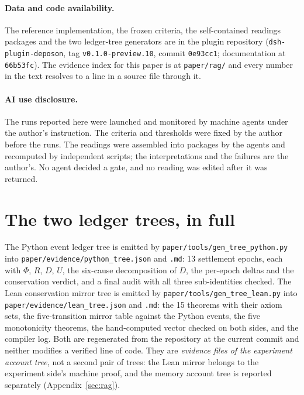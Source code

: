 \documentclass[11pt,a4paper]{article}
\begin{document}
\paragraph{Data and code availability.}
The reference implementation, the frozen criteria, the self-contained readings packages and the two ledger-tree generators are in the plugin repository (\texttt{dsh-plugin-deposon}, tag \texttt{v0.1.0-preview.10}, commit \texttt{0e93cc1}; documentation at \texttt{66b53fc}). The evidence index for this paper is at \texttt{paper/rag/} and every number in the text resolves to a line in a source file through it.

\paragraph{AI use disclosure.}
The runs reported here were launched and monitored by machine agents under the author's instruction. The criteria and thresholds were fixed by the author before the runs. The readings were assembled into packages by the agents and recomputed by independent scripts; the interpretations and the failures are the author's. No agent decided a gate, and no reading was edited after it was returned.

\appendix

\section{The two ledger trees, in full}
\label{app:trees}
The Python event ledger tree is emitted by \texttt{paper/tools/gen\_tree\_python.py} into \texttt{paper/evidence/python\_tree.json} and \texttt{.md}: 13 settlement epochs, each with $\Phi$, $R$, $D$, $U$, the six-cause decomposition of $D$, the per-epoch deltas and the conservation verdict, and a final audit with all three sub-identities checked. The Lean conservation mirror tree is emitted by \texttt{paper/tools/gen\_tree\_lean.py} into \texttt{paper/evidence/lean\_tree.json} and \texttt{.md}: the 15 theorems with their axiom sets, the five-transition mirror table against the Python events, the five monotonicity theorems, the hand-computed vector checked on both sides, and the compiler log. Both are regenerated from the repository at the current commit and neither modifies a verified line of code. They are \emph{evidence files of the experiment account tree}, not a second pair of trees: the Lean mirror belongs to the experiment side's machine proof, and the memory account tree is reported separately (Appendix~\ref{sec:rag}).
\end{document}
